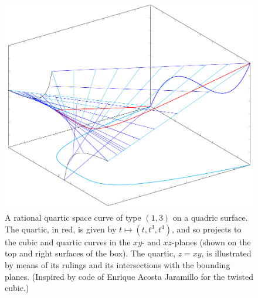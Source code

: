 \begin{figure}
\Small
\hskip-46pt\vbox{\vskip-24pt\hbox{\includegraphics[scale=0.6,angle=74]{main/Fig03-newfigg}}\vskip-20pt}\hskip-50pt
%
%
%
%
%
%
%
%
%
%
%
%
%
%
%
%
%
%
%
%
%
%
%
%
%
%
%
\caption{A rational quartic space curve of type $(1,3)$ on a quadric
  surface. The quartic, in red, is given by $t\mapsto (t,t^3,t^4)$,
  and so projects to the cubic and quartic curves in the
  $xy$- and $xz$-planes (shown on the top and right surfaces of the
  box). The quartic, $z=xy$, is illustrated by means of its rulings
  and its intersections with the bounding planes. (Inspired by code of
  Enrique Acosta Jaramillo for the twisted cubic.)
%
}
\end{figure}

